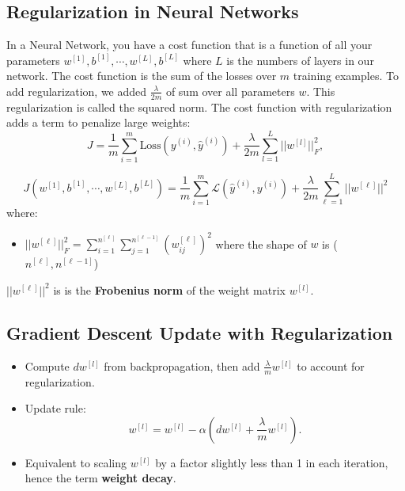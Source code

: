 \documentclass[letterpaper,12pt,notitlepage,twoside]{report}
\begin{document}
\subsection*{Regularization in Neural Networks}

In a Neural Network, you have a cost function that is a function of all your parameters \(w^{[1]}, b^{[1]}, \cdots, w^{[L]}, b^{[L]}\) where \( L \) is 
the numbers of layers in our network. The cost function is the sum of the losses over \( m \) training examples. To add regularization, we added \( \frac{\lambda}{2m} \) 
of sum over all parameters \( w \). This regularization is called the squared norm. The cost function with regularization adds a term to penalize large weights:
    \[
    J = \frac{1}{m} \sum_{i=1}^m \text{Loss}(y^{(i)}, \hat{y}^{(i)}) + \frac{\lambda}{2m} \sum_{l=1}^L ||w^{[l]}||_F^2,
    \]

\begin{equation}
J(w^{[1]}, b^{[1]}, \cdots, w^{[L]}, b^{[L]}) = \frac{1}{m} \sum_{i=1}^m \mathcal{L} (\hat{y}^{(i)}, y^{(i)}) + \frac{\lambda}{2m} \sum_{\ell=1}^L ||w^{[\ell]}||^2
\end{equation}
where:
\begin{itemize}
\item \( ||w^{[\ell]}||_F^2 = \sum_{i=1}^{n^{[\ell]}} \sum_{j=1}^{n^{[\ell-1]}} (w_{ij}^{[\ell]})^2 \) where the shape of \( w \) is (\(n^{[\ell]}, n^{[\ell-1]} \))
\end{itemize}

\( ||w^{[\ell]}||^2 \) is is the \textbf{Frobenius norm} of the weight matrix \( w^{[l]} \).

\subsection*{Gradient Descent Update with Regularization}
\begin{itemize}
    \item Compute \( dw^{[l]} \) from backpropagation, then add \( \frac{\lambda}{m} w^{[l]} \) to account for regularization.
    \item Update rule: 
    \[
    w^{[l]} = w^{[l]} - \alpha \left( dw^{[l]} + \frac{\lambda}{m} w^{[l]} \right).
    \]
    \item Equivalent to scaling \( w^{[l]} \) by a factor slightly less than 1 in each iteration, hence the term \textbf{weight decay}.
\end{itemize}
\end{document}
